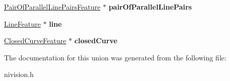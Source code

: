 \begin{DoxyCompactItemize}
\item 
\hypertarget{unionGeometricFeature__union_a45647053f785b11ee2d8ff08701ed631}{
\hyperlink{structPairOfParallelLinePairsFeature__struct}{PairOfParallelLinePairsFeature} $\ast$ {\bfseries pairOfParallelLinePairs}}
\label{unionGeometricFeature__union_a45647053f785b11ee2d8ff08701ed631}

\item 
\hypertarget{unionGeometricFeature__union_aefb3f0d2e81ad94410aaf339b4564249}{
\hyperlink{structLineFeature__struct}{LineFeature} $\ast$ {\bfseries line}}
\label{unionGeometricFeature__union_aefb3f0d2e81ad94410aaf339b4564249}

\item 
\hypertarget{unionGeometricFeature__union_a1d50598487d3ad4a33bf1bde4766628b}{
\hyperlink{structClosedCurveFeature__struct}{ClosedCurveFeature} $\ast$ {\bfseries closedCurve}}
\label{unionGeometricFeature__union_a1d50598487d3ad4a33bf1bde4766628b}

\end{DoxyCompactItemize}


The documentation for this union was generated from the following file:\begin{DoxyCompactItemize}
\item 
nivision.h\end{DoxyCompactItemize}
